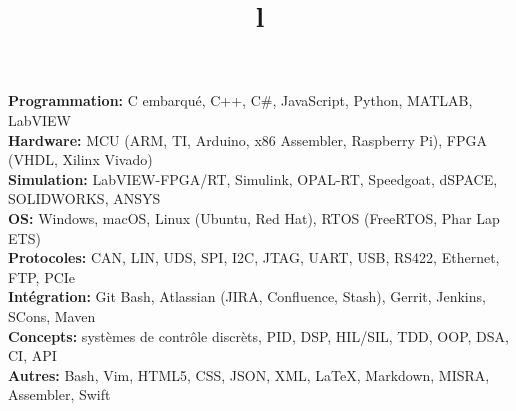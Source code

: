 \documentclass[mm]{res}
\begin{document}



\begin{resume}

\npspctoprule
\section{\headingskills}
\tb \textbf{Programmation:} C embarqu\'e, C++, C\#, JavaScript, Python, MATLAB, LabVIEW\\
\tb \textbf{Hardware:} MCU (ARM, TI, Arduino, x86 Assembler, Raspberry Pi), FPGA (VHDL, Xilinx Vivado)\\
\tb \textbf{Simulation:} LabVIEW-FPGA/RT, Simulink, OPAL-RT, Speedgoat, dSPACE, SOLIDWORKS, ANSYS\\
\tb \textbf{OS:} Windows, macOS, Linux (Ubuntu, Red Hat), RTOS (FreeRTOS, Phar Lap ETS)\\
\tb \textbf{Protocoles:} CAN, LIN, UDS, SPI, I2C, JTAG, UART, USB, RS422, Ethernet, FTP, PCIe\\
\tb \textbf{Int\'egration:} Git Bash, Atlassian (JIRA, Confluence, Stash), Gerrit, Jenkins, SCons, Maven\\
\tb \textbf{Concepts:} syst\`emes de contr\^ole discr\`ets, PID, DSP, HIL/SIL, TDD, OOP, DSA, CI, API\\
\tb \textbf{Autres:} Bash, Vim, HTML5, CSS, JSON, XML, \LaTeX, Markdown, MISRA, Assembler, Swift


\toprule

\section{\headingeducation}
\begin{format}
\\
\title{l}\\
\end{format}  


\end{resume}
\end{document}
